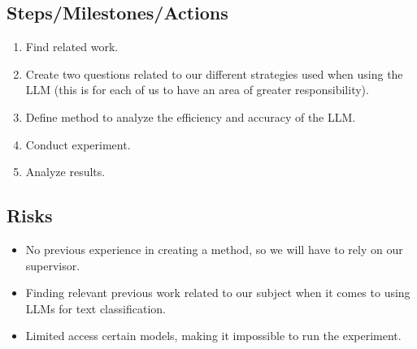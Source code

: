 \subsection{Steps/Milestones/Actions}

\begin{enumerate}
      \item Find related work.
      \item Create two questions related to our different strategies used
            when using the LLM (this is for each of us to have an area of
            greater responsibility).
      \item Define method to analyze the efficiency and accuracy of the LLM.
      \item Conduct experiment.
      \item Analyze results.
\end{enumerate}

\subsection{Risks}

\begin{itemize}
      \item No previous experience in creating a method, so we will have to rely on our
            supervisor.
      \item Finding relevant previous work related to our subject when it comes to using LLMs
            for text classification.
      \item Limited access certain models, making it impossible to run the experiment.
\end{itemize}
